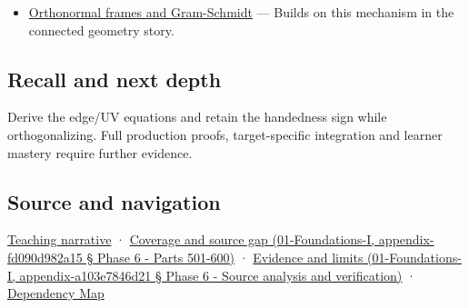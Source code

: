 \begin{itemize}
\tightlist
\item
  \hyperref[appendix-c39f1ed34271]{Orthonormal frames and Gram-Schmidt} --- Builds on this mechanism in the connected geometry story.
\end{itemize}

\subsection{Recall and next depth}\label{recall-and-next-depth}

Derive the edge/UV equations and retain the handedness sign while orthogonalizing. Full production proofs, target-specific integration and learner mastery require further evidence.

\subsection{Source and navigation}\label{source-and-navigation}

\href{Continuous\%20Notes/Computing\%20Foundations\%20-\%20From\%20Bits\%20to\%20C++\%20and\%20Systems\%20APIs\#Surface\%20movement\%20becomes\%20a\%20local\%20frame}{Teaching narrative} · \href{}{Coverage and source gap (01-Foundations-I, appendix-fd090d982a15 § Phase 6 - Parts 501-600)} · \href{}{Evidence and limits (01-Foundations-I, appendix-a103e7846d21 § Phase 6 - Source analysis and verification)} · \hyperref[appendix-4ad47bdd269a]{Dependency Map}

